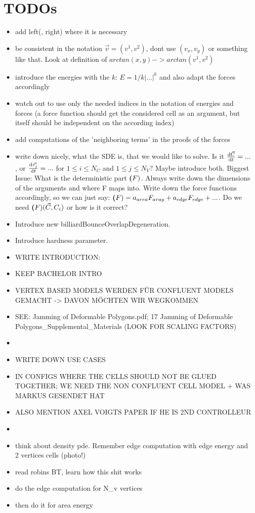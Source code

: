 \section{TODOs}

\begin{itemize}
    \item add left(, right) where it is necessary 
    \item be consistent in the notation $\vec{v} = (v^1, v^2)$, dont use $(v_x, v_y)$ or something like that. Look at definition of $arctan(x,y) -> arctan(v^1,v^2)$
    \item introduce the energies with the $k$: $E = 1/k |...|^k$ and also adapt the forces accordingly 
    \item watch out to use only the needed indices in the notation of energies and forces (a force function should get the considered cell as an argument, but itself should be independent on the according index)
    \item add computations of the 'neighboring terms' in the proofs of the forces  
    \item write down nicely, what the SDE is, that we would like to solve. Is it $\frac{\mathrm{d} \vec{C}}{\mathrm{d} t} = ... $, or $\frac{\mathrm{d} \vec{v}_j^i}{\mathrm{d} t} = ... $ for $ 1 \leq i \leq N_C$ and $1 \leq j \leq N_V$? Maybe introduce both. Biggest Issue: What is the deterministic part $\textbf(F)$. Always write down the dimensions of the arguments and where F maps into. Write down the force functions accordingly, so we can just say: $\textbf(F) = a_{area} F_{aray} + a_{edge} F_{edge} + ...$. Do we need $\textbf(F)(\vec{C}, C_i)$ or how is it correct?
    \item Introduce new billiardBounceOverlapDegeneration.
    \item Introduce hardness parameter. 
    \item WRITE INTRODUCTION:
    \item KEEP BACHELOR INTRO 
    \item VERTEX BASED MODELS WERDEN FÜR CONFLUENT MODELS GEMACHT -> DAVON MÖCHTEN WIR WEGKOMMEN 
    \item SEE: Jamming of Deformable Polygons.pdf; 17 Jamming of Deformable Polygons_Supplemental_Materials (LOOK FOR SCALING FACTORS)
    \item 
    \item WRITE DOWN USE CASES 
    \item IN CONFIGS WHERE THE CELLS SHOULD NOT BE GLUED TOGETHER; WE NEED THE NON CONFLUENT CELL MODEL + WAS MARKUS GESENDET HAT 
    \item ALSO MENTION AXEL VOIGTS PAPER IF HE IS 2ND CONTROLLEUR 
    \item      
    \item think about density pde. Remember edge computation with edge energy and 2 vertices cells (photo!)
    \item read robins BT, learn how this shit works 
    \item do the edge computation for N_v vertices 
    \item then do it for area energy       
\end{itemize}